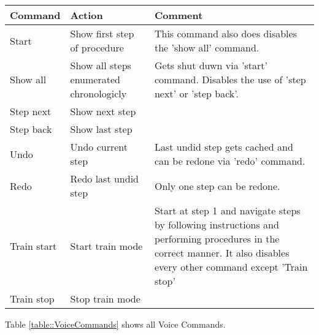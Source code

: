 \begin{center}
    \label{table::VoiceCommands}
    \begin{tabular}{ | l | p{4cm} | p{8cm} |}
    \hline
    Command & Action & Comment \\ \hline
    Start & Show first step of procedure & This command also does disables the 'show all' command. \\ \hline
    Show all & Show all steps enumerated chronologicly & Gets shut duwn via 'start' command. \newline
    Disables the use of 'step next' or 'step back'. \\ \hline
    Step next & Show next step & \\ \hline
    Step back & Show last step & \\ \hline
    Undo & Undo current step & Last undid step gets cached and can be redone via 'redo' command. \\ \hline
    Redo & Redo last undid step & Only one step can be redone. \\ \hline
    Train start & Start train mode & Start at step 1 and navigate steps by following instructions and performing procedures in the correct manner.
    It also disables every other command except 'Train stop' \\ \hline
    Train stop & Stop train mode & \\ \hline
    \end{tabular}
\end{center}

Table \ref{table::VoiceCommands} shows all Voice Commands.